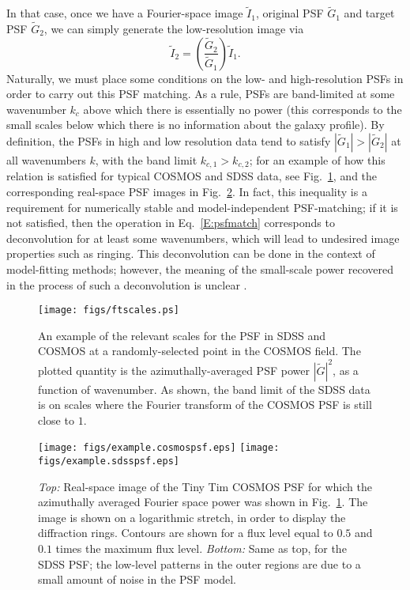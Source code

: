 \documentclass[twocolumn,useAMS,usenatbib]{mn2e}
\newcommand{\beq}{\begin{equation}}
\newcommand{\eeq}{\end{equation}}
\newcommand{\newtext}{}
\begin{document}
In that case, once we have a Fourier-space image $\tilde{I}_1$, original PSF
$\tilde{G}_1$ and target PSF $\tilde{G}_2$, we can simply generate the
low-resolution image via
\beq\label{E:psfmatch}
\tilde{I}_2 = \left(\frac{\tilde{G}_2}{\tilde{G}_1}\right) \tilde{I}_1.
\eeq
Naturally, we must place some conditions on the low- and
high-resolution PSFs in order to carry out this PSF matching.  As a
rule, PSFs are band-limited at some wavenumber $k_c$ above which there
is essentially no power (this corresponds to the small scales below
which there is no information about the galaxy profile).  By
definition, the PSFs in high and low resolution data tend
to satisfy $|\tilde{G}_1| >|\tilde{G}_2|$ at all wavenumbers $k$, with
the band limit $k_{c,1} > k_{c,2}$; for an example of how this
relation is satisfied for typical COSMOS and SDSS data, see
Fig.~\ref{F:ftscales}, \newtext{and the corresponding real-space PSF images in Fig.~\ref{F:psfs}}.  In fact, this inequality is a requirement for
numerically stable and model-independent PSF-matching; if it is not satisfied, then
the operation in Eq.~\eqref{E:psfmatch} corresponds to deconvolution
for at least some wavenumbers, which 
will lead to undesired image properties such as
ringing.  This deconvolution can be done in the context of
model-fitting methods; however, the meaning of the small-scale power
recovered in the process of such a deconvolution is unclear \citep{2010MNRAS.406.2793B}.

\begin{figure}
\begin{center}
\texttt{[image: figs/ftscales.ps]}
\caption{\label{F:ftscales}An example of the relevant scales for the
  PSF in SDSS and COSMOS at a randomly-selected point in the COSMOS field.  The
  plotted quantity is the azimuthally-averaged PSF power
  $|\tilde{G}|^2$, as a function of wavenumber.  As shown, the
  band limit of the SDSS data is on scales where the Fourier transform
  of the COSMOS PSF is still close to $1$. 
  }
\end{center}
\end{figure}

\begin{figure}
\begin{center}
\texttt{[image: figs/example.cosmospsf.eps]}
\texttt{[image: figs/example.sdsspsf.eps]}
\caption{\label{F:psfs}\newtext{{\em Top:} Real-space image of the
    Tiny Tim COSMOS PSF
  for which the azimuthally averaged Fourier space power was shown in
  Fig.~\ref{F:ftscales}.  The image is shown on a logarithmic stretch,
  in order to display the diffraction rings.  Contours are shown for a
  flux level equal to $0.5$ and $0.1$ times the maximum flux level. {\em Bottom:} Same as top, for
  the SDSS PSF; the low-level patterns in the outer regions are due to
  a small amount of noise  in the
   PSF model.}
  }
\end{center}
\end{figure}
\end{document}

